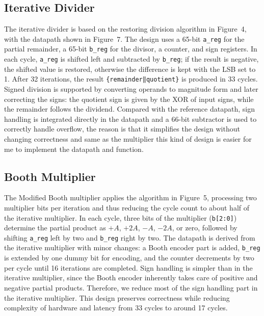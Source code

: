 \documentclass[11pt,a4paper]{article}
\begin{document}
\subsection{Iterative Divider}

The iterative divider is based on the restoring division algorithm in Figure~4, 
with the datapath shown in Figure~7. The design uses a 65-bit \texttt{a\_reg} for the 
partial remainder, a 65-bit \texttt{b\_reg} for the divisor, a counter, and sign registers. 
In each cycle, \texttt{a\_reg} is shifted left and subtracted by \texttt{b\_reg}; if the 
result is negative, the shifted value is restored, otherwise the difference is kept with 
the LSB set to 1. After 32 iterations, the result \texttt{\{remainder‖quotient\}} is 
produced in 33 cycles. Signed division is supported by converting operands to magnitude 
form and later correcting the signs: the quotient sign is given by the XOR of input 
signs, while the remainder follows the dividend. Compared with the reference datapath, 
sign handling is integrated directly in the datapath and a 66-bit subtractor is used 
to correctly handle overflow, the reason is that it simplifies the design without changing correctness and same
as the multiplier this kind of design is easier for me to implement the datapath and function.


\subsection{Booth Multiplier }
The Modified Booth multiplier applies the algorithm in Figure~5, 
processing two multiplier bits per iteration and thus reducing the cycle count 
to about half of the iterative multiplier. In each cycle, three bits of the multiplier 
(\texttt{b[2:0]}) determine the partial product as $+A$, $+2A$, $-A$, $-2A$, or zero, 
followed by shifting \texttt{a\_reg} left by two and \texttt{b\_reg} right by two. 
The datapath is derived from the iterative multiplier with minor changes: a Booth encoder part is added, 
\texttt{b\_reg} is extended by one dummy bit for encoding, and the counter decrements by two per cycle 
until 16 iterations are completed. Sign handling is simpler than in the iterative multiplier, 
since the Booth encoder inherently takes care of positive and negative partial products. Therefore, we reduce most of the
sign handling part in the iterative multiplier.
This design preserves correctness while reducing complexity of hardware and latency from 33 cycles to around 17 cycles.
\end{document}
